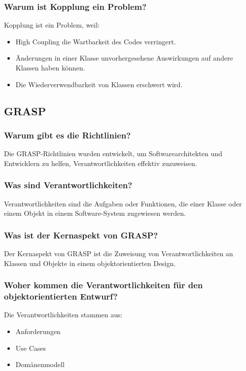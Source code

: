 \documentclass[main.tex]{subfiles}
\begin{document}
\subsubsection*{Warum ist \gls{Kopplung} ein Problem?}
\gls{Kopplung} ist ein Problem, weil:
\begin{itemize}
    \item  \gls{High Coupling} die Wartbarkeit des Codes verringert.
    \item Änderungen in einer Klasse unvorhergesehene Auswirkungen auf andere Klassen haben können.
    \item Die Wiederverwendbarkeit von Klassen erschwert wird.
\end{itemize}


\subsection{GRASP}
\subsubsection*{Warum gibt es die Richtlinien?}Die GRASP-Richtlinien wurden entwickelt, um Softwarearchitekten und Entwicklern zu helfen, Verantwortlichkeiten effektiv zuzuweisen.

\subsubsection*{Was sind Verantwortlichkeiten?}
Verantwortlichkeiten sind die Aufgaben oder Funktionen, die einer Klasse oder einem Objekt in einem Software-System zugewiesen werden.

\subsubsection*{Was ist der Kernaspekt von GRASP?}
Der Kernaspekt von GRASP ist die Zuweisung von Verantwortlichkeiten an Klassen und Objekte in einem objektorientierten Design.

\subsubsection*{Woher kommen die Verantwortlichkeiten für den objektorientierten Entwurf?}
Die Verantwortlichkeiten stammen aus:
\begin{itemize}
    \item Anforderungen
    \item \glspl{Use Case}
    \item \gls{Domänenmodell}
\end{itemize}
\end{document}
